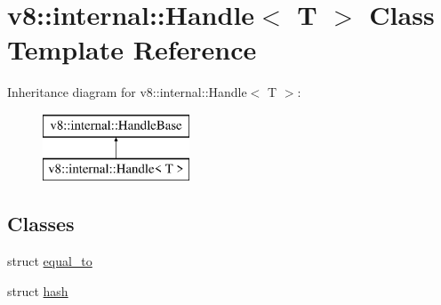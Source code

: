 \hypertarget{classv8_1_1internal_1_1_handle}{}\section{v8\+:\+:internal\+:\+:Handle$<$ T $>$ Class Template Reference}
\label{classv8_1_1internal_1_1_handle}
Inheritance diagram for v8\+:\+:internal\+:\+:Handle$<$ T $>$\+:\begin{figure}[H]
\begin{center}
\leavevmode
\includegraphics[height=2.000000cm]{classv8_1_1internal_1_1_handle}
\end{center}
\end{figure}
\subsection*{Classes}
\begin{DoxyCompactItemize}
\item 
struct \hyperlink{structv8_1_1internal_1_1_handle_1_1equal__to}{equal\+\_\+to}
\item 
struct \hyperlink{structv8_1_1internal_1_1_handle_1_1hash}{hash}
\end{DoxyCompactItemize}
